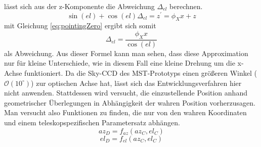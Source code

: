 lässt sich aus der z-Komponente die Abweichung $\Delta_{el}$ berechnen.
\begin{equation}
\sin(el)+\cos(el)\Delta_{el}=z^{\prime}=\phi_Xx+z
\end{equation}
mit Gleichung \ref{eq:pointingZero} ergibt sich somit 
\begin{equation}
\Delta_{el}=\frac{\phi_Xx}{\cos(el)}
\end{equation}
als Abweichung. Aus dieser Formel kann man sehen, dass diese Approximation nur für kleine Unterschiede, wie in diesem Fall eine kleine Drehung um die x-Achse funktioniert.
Da die Sky-CCD des MST-Prototyps einen größeren Winkel ($\mathcal{O}\left(10^{\circ}\right)$) zur optischen Achse hat, lässt sich das Entwicklungsverfahren hier nicht anwenden. Stattdessen wird versucht, die einzustellende Position anhand geometrischer Überlegungen in Abhängigkeit der wahren Position vorherzusagen. Man versucht also Funktionen zu finden, die nur von den wahren Koordinaten und einem teleskopspezifischen Parametersatz abhängen.
\begin{equation} 
az_D=f_{az}(az_C,el_C)
\end{equation}
\begin{equation}
el_D=f_{el}(az_C,el_C)
\label{eq:pointingprinciple}
\end{equation}

